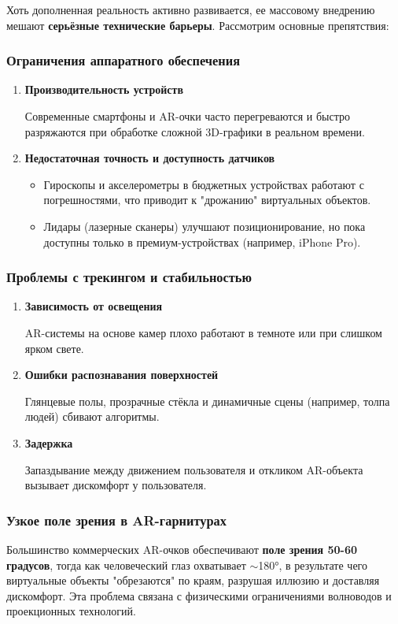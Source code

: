 Хоть дополненная реальность активно развивается, ее массовому внедрению мешают \textbf{серьёзные технические барьеры}. Рассмотрим основные препятствия:

\subsubsection{Ограничения аппаратного обеспечения}
\begin{enumerate}
    \item \textbf{Производительность устройств}
    
    Современные смартфоны и AR-очки часто перегреваются и быстро разряжаются при обработке сложной 3D-графики в реальном времени.
    
    \item \textbf{Недостаточная точность и доступность датчиков}
    \begin{itemize}
        \item Гироскопы и акселерометры в бюджетных устройствах работают с погрешностями, что приводит к "дрожанию" виртуальных объектов.
        \item Лидары (лазерные сканеры) улучшают позиционирование, но пока доступны только в премиум-устройствах (например, iPhone Pro).
    \end{itemize}
\end{enumerate}

\subsubsection{Проблемы с трекингом и стабильностью}
\begin{enumerate}
    \item \textbf{Зависимость от освещения}
    
    AR-системы на основе камер плохо работают в темноте или при слишком ярком свете.
    
    \item \textbf{Ошибки распознавания поверхностей}
    
    Глянцевые полы, прозрачные стёкла и динамичные сцены (например, толпа людей) сбивают алгоритмы.
    
    \item \textbf{Задержка}
    
    Запаздывание между движением пользователя и откликом AR-объекта вызывает дискомфорт у пользователя.
\end{enumerate}

\subsubsection{Узкое поле зрения в AR-гарнитурах}
Большинство коммерческих AR-очков обеспечивают \textbf{поле зрения 50-60 градусов}, тогда как человеческий глаз охватывает $\sim$180°, в результате чего виртуальные объекты "обрезаются" по краям, разрушая иллюзию и доставляя дискомфорт. Эта проблема связана с физическими ограничениями волноводов и проекционных технологий.

